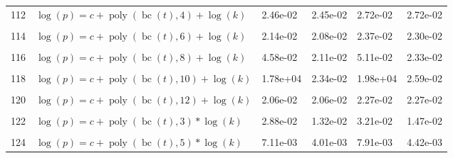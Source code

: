 \documentclass[12pt,a4paper]{article}
\DeclareMathOperator{\bc}{bc}
\DeclareMathOperator{\poly}{poly}
\begin{document}
\begin{longtable}[t]{ll>{\raggedleft\arraybackslash}p{2cm}>{\raggedleft\arraybackslash}p{2cm}>{\raggedleft\arraybackslash}p{2cm}>{\raggedleft\arraybackslash}p{2cm}}
112 & $\log(p) = c + \poly\left( \bc(t), 4 \right) + \log(k)$ & 2.46e-02 & 2.45e-02 & 2.72e-02 & 2.72e-02\\
\cellcolor{gray!6}{113} & \cellcolor{gray!6}{$\log(p) = c + \poly\left( \bc(t), 5 \right) + \log(k)$} & \cellcolor{gray!6}{2.18e-02} & \cellcolor{gray!6}{2.09e-02} & \cellcolor{gray!6}{2.41e-02} & \cellcolor{gray!6}{2.31e-02}\\
114 & $\log(p) = c + \poly\left( \bc(t), 6 \right) + \log(k)$ & 2.14e-02 & 2.08e-02 & 2.37e-02 & 2.30e-02\\
\cellcolor{gray!6}{115} & \cellcolor{gray!6}{$\log(p) = c + \poly\left( \bc(t), 7 \right) + \log(k)$} & \cellcolor{gray!6}{2.10e-02} & \cellcolor{gray!6}{2.08e-02} & \cellcolor{gray!6}{2.31e-02} & \cellcolor{gray!6}{2.30e-02}\\
116 & $\log(p) = c + \poly\left( \bc(t), 8 \right) + \log(k)$ & 4.58e-02 & 2.11e-02 & 5.11e-02 & 2.33e-02\\
\cellcolor{gray!6}{117} & \cellcolor{gray!6}{$\log(p) = c + \poly\left( \bc(t), 9 \right) + \log(k)$} & \cellcolor{gray!6}{2.50e-02} & \cellcolor{gray!6}{2.32e-02} & \cellcolor{gray!6}{2.77e-02} & \cellcolor{gray!6}{2.57e-02}\\
118 & $\log(p) = c + \poly\left( \bc(t), 10 \right) + \log(k)$ & 1.78e+04 & 2.34e-02 & 1.98e+04 & 2.59e-02\\
\cellcolor{gray!6}{119} & \cellcolor{gray!6}{$\log(p) = c + \poly\left( \bc(t), 11 \right) + \log(k)$} & \cellcolor{gray!6}{2.12e-02} & \cellcolor{gray!6}{2.09e-02} & \cellcolor{gray!6}{2.34e-02} & \cellcolor{gray!6}{2.31e-02}\\
120 & $\log(p) = c + \poly\left( \bc(t), 12 \right) + \log(k)$ & 2.06e-02 & 2.06e-02 & 2.27e-02 & 2.27e-02\\
\cellcolor{gray!6}{121} & \cellcolor{gray!6}{$\log(p) = c + \poly\left( \bc(t), 13 \right) + \log(k)$} & \cellcolor{gray!6}{5.33e+00} & \cellcolor{gray!6}{2.13e-02} & \cellcolor{gray!6}{5.96e+00} & \cellcolor{gray!6}{2.35e-02}\\
122 & $\log(p) = c + \poly\left( \bc(t), 3 \right) * \log(k)$ & 2.88e-02 & 1.32e-02 & 3.21e-02 & 1.47e-02\\
\cellcolor{gray!6}{123} & \cellcolor{gray!6}{$\log(p) = c + \poly\left( \bc(t), 4 \right) * \log(k)$} & \cellcolor{gray!6}{9.50e-03} & \cellcolor{gray!6}{9.49e-03} & \cellcolor{gray!6}{1.06e-02} & \cellcolor{gray!6}{1.06e-02}\\
124 & $\log(p) = c + \poly\left( \bc(t), 5 \right) * \log(k)$ & 7.11e-03 & 4.01e-03 & 7.91e-03 & 4.42e-03\\

\end{longtable}
\end{document}
